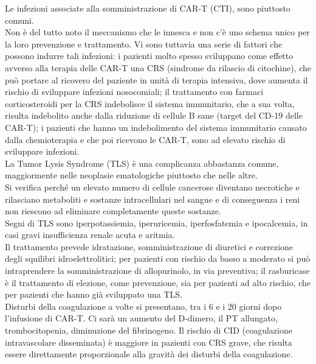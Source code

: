 Le infezioni associate alla somministrazione di CAR-T (CTI), sono piuttosto comuni.\\ Non è del tutto noto il meccanismo 
che le innesca e non c’è uno schema unico per la loro prevenzione e trattamento\cite{Frontiers}. Vi sono tuttavia una serie di fattori 
che possono indurre tali infezioni: i pazienti molto spesso sviluppano come effetto avverso alla terapia delle CAR-T 
una CRS (sindrome da rilascio di citochine), che può portare al ricovero del paziente in unità di terapia intensiva, 
dove aumenta il rischio di sviluppare infezioni nosocomiali; il trattamento con farmaci corticosteroidi per la CRS 
indebolisce il sistema immunitario, che a sua volta, risulta indebolito anche dalla riduzione di cellule B sane 
(target del CD-19 delle CAR-T); 
i pazienti che hanno un indebolimento del sistema immunitario causato dalla chemioterapia e che poi ricevono le CAR-T, 
sono ad elevato rischio di sviluppare infezioni\cite{Frontiers}.\\

La Tumor Lysis Syndrome (TLS) è una complicanza abbastanza comune, maggiormente nelle neoplasie ematologiche piuttosto 
che nelle altre\cite{Frontiers}.\\ 
Si verifica perché un elevato numero di cellule cancerose diventano necrotiche e rilasciano metaboliti e
sostanze intracellulari nel sangue e di conseguenza i reni non riescono ad eliminare completamente queste sostanze.\\ 
Segni di TLS sono iperpotassiemia, iperuricemia, iperfosfatemia e ipocalcemia, in casi gravi insufficienza renale 
acuta e aritmia\cite{Frontiers}.\\ 
Il trattamento prevede idratazione, somministrazione di diuretici e 
correzione degli squilibri idroelettrolitici; per pazienti con rischio da basso a moderato si può intraprendere la 
somministrazione di allopurinolo, in via preventiva; il rasburicase è il trattamento di elezione, come prevenzione,
sia per pazienti ad alto rischio, che per pazienti che hanno già sviluppato una TLS\cite{Frontiers}.\\

Disturbi della coagulazione a volte si presentano, tra i 6 e i 20 giorni dopo l’infusione di CAR-T. Ci sarà un  
aumento del D-dimero, il PT allungato, trombocitopenia, diminuzione del fibrinogeno. Il rischio di CID 
(coagulazione intravascolare disseminata) è maggiore in pazienti con CRS grave, 
che risulta essere direttamente proporzionale alla gravità dei disturbi della coagulazione\cite{Frontiers}.\\

